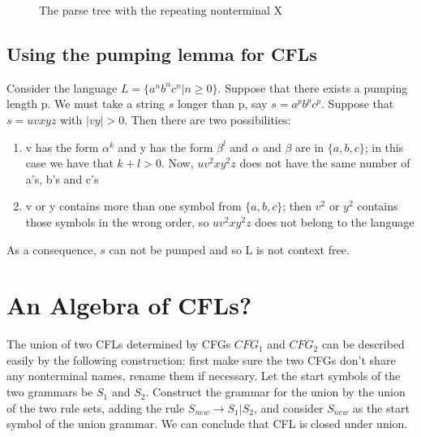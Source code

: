 \begin{figure}[h]
\caption{The parse tree with the repeating nonterminal
  X \label{parsetree2}}
\end{figure}


\subsection{Using the pumping lemma for CFLs}\label{voorbeeldpompcfl}

Consider the language $L = \{a^nb^nc^n | n \geq 0\}$. Suppose that
there exists a pumping length p. We must take a string $s$ longer than
p, say $s = a^pb^pc^p$.  Suppose that $s = uvxyz$ with $|vy| >
0$. Then there are two possibilities:
\begin{enumerate}
\item
v has the form $\alpha^k$ and y has the form $\beta^l$ and
$\alpha$ and $\beta$ are in $\{a,b,c\}$; in this case we have that
$k+l > 0$. Now, $uv^2xy^2z$ does not have the same number of a's, b's
and c's

\item
v or y contains more than one symbol from $\{a,b,c\}$; then $v^2$ or
$y^2$ contains those symbols in the wrong order, so $uv^2xy^2z$ does not belong to the language

\end{enumerate}

As a consequence, $s$ can not be pumped and so L is not context free.



\section{An Algebra of CFLs?}

The union of two CFLs determined by CFGs $CFG_1$ and $CFG_2$ can be
described easily by the following construction: first make sure the two CFGs don't share any nonterminal names, rename them if necessary. Let the start symbols of the two
grammars be $S_1$ and $S_2$. Construct the grammar for the union by
the union of the two rule sets, adding the rule $S_{new} \rightarrow
S_1 | S_2$, and consider $S_{new}$ as the start symbol of the union
grammar. We can conclude that CFL is closed under union.

